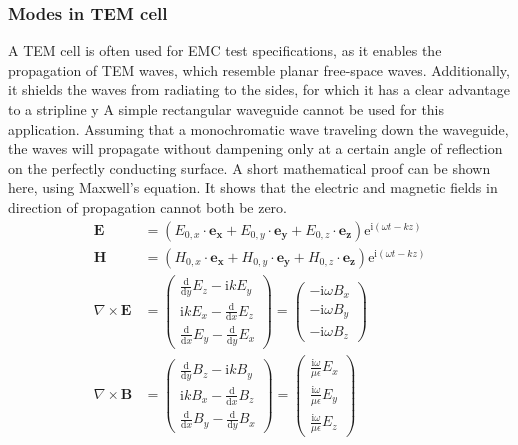 \subsubsection{Modes in TEM cell}

A TEM cell is often used for EMC test specifications, as it enables the propagation of TEM waves, which resemble planar free-space waves. Additionally, it shields the waves from radiating to the sides, for which it has a clear advantage to a stripline \cite{809846}y
A simple rectangular waveguide cannot be used for this application. Assuming that a monochromatic wave traveling down the waveguide, the waves will propagate without dampening only at a certain angle of reflection on the perfectly conducting surface. A short mathematical proof can be shown here, using Maxwell's equation. It shows that the electric and magnetic fields in direction of propagation cannot both be zero. %
\begin{align}
    \mathbf{E}&=(E_{0,x}\cdot\mathbf{e_x}+E_{0,y}\cdot\mathbf{e_y}+E_{0,z}\cdot\mathbf{e_z})\mathrm{e}^{\mathrm{i}(\omega t-kz)}\\
    \mathbf{H}&=(H_{0,x}\cdot\mathbf{e_x}+H_{0,y}\cdot\mathbf{e_y}+H_{0,z}\cdot\mathbf{e_z})\mathrm{e}^{\mathrm{i}(\omega t-kz)}\\
    \nabla \times \mathbf{E} &=\begin{pmatrix}\frac{\mathrm{d}}{\mathrm{d}y}E_z-\mathrm{i}kE_y \\\mathrm{i}kE_x-\frac{\mathrm{d}}{\mathrm{d}x}E_z \\\frac{\mathrm{d}}{\mathrm{d}x}E_y-\frac{\mathrm{d}}{\mathrm{d}y}E_x\end{pmatrix}=\begin{pmatrix} -\mathrm{i}\omega B_x\\-\mathrm{i}\omega B_y\\ -\mathrm{i}\omega B_z \end{pmatrix}\\
    \nabla \times \mathbf{B} &=\begin{pmatrix}\frac{\mathrm{d}}{\mathrm{d}y}B_z-\mathrm{i}kB_y \\\mathrm{i}kB_x-\frac{\mathrm{d}}{\mathrm{d}x}B_z \\\frac{\mathrm{d}}{\mathrm{d}x}B_y-\frac{\mathrm{d}}{\mathrm{d}y}B_x\end{pmatrix}=\begin{pmatrix} \frac{\mathrm{i}\omega}{\mu\epsilon} E_x\\\frac{\mathrm{i}\omega}{\mu\epsilon} E_y\\ \frac{\mathrm{i}\omega}{\mu\epsilon} E_z \end{pmatrix}
\end{align}

